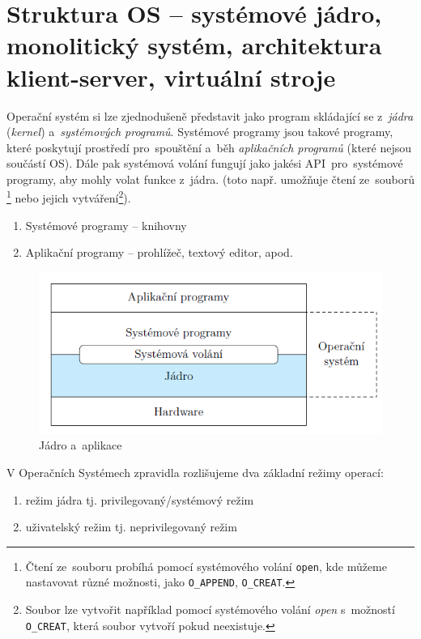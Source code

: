 
\section{Struktura OS – systémové jádro, monolitický systém, architektura klient-server, virtuální stroje} \label{kernel}

Operační systém si lze zjednodušeně představit jako program skládající se z~\emph{jádra} (\emph{kernel}) a~\emph{systémových programů}. Systémové programy jsou takové programy, které poskytují prostředí pro~spouštění a~běh \emph{aplikačních programů} (které nejsou součástí OS). Dále pak systémová volání fungují jako jakési API~pro~systémové programy, aby mohly volat funkce z~jádra. (toto např. umožňuje čtení ze~souborů \footnote{Čtení ze~souboru probíhá pomocí systémového volání \texttt{open}, kde můžeme nastavovat různé možnosti, jako \texttt{O\_APPEND}, \texttt{O\_CREAT}.} nebo jejich vytváření\footnote{Soubor lze vytvořit například pomocí systémového volání \emph{open} s~možností \texttt{O\_CREAT}, která soubor vytvoří pokud neexistuje.}).

\begin{enumerate}[noitemsep]
    \item Systémové programy -- knihovny
    \item Aplikační programy -- prohlížeč, textový editor, apod. 
\end{enumerate}

\begin{figure}[ht]
    \centering
    \includegraphics[scale=1]{images/OS_kernel_apps.png}
    \caption{Jádro a~aplikace}
    \label{OS_kernel_apps}
\end{figure}

V Operačních Systémech zpravidla rozlišujeme dva základní režimy operací:

\begin{enumerate}[noitemsep]
    \item režim jádra tj. privilegovaný/systémový režim
    \item uživatelský režim tj. neprivilegovaný režim
\end{enumerate}

